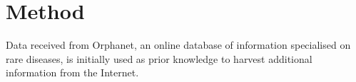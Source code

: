 \documentclass[10pt,letterpaper,final]{article}
\begin{document}














\section{Method}
\label{chap:method}
Data received from Orphanet, an online database of information
specialised on rare diseases, is initially used as prior knowledge to
harvest additional information from the Internet.
\end{document}
